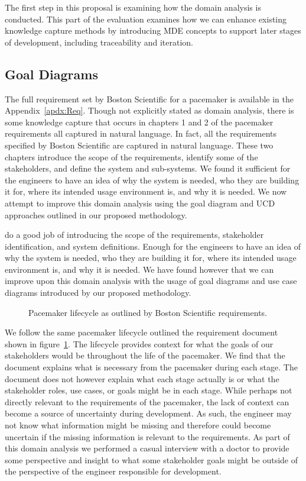The first step in this proposal is examining how the domain analysis is conducted. This part of the evaluation examines how we can enhance existing knowledge capture methods by introducing \ac{MDE} concepts to support later stages of development, including traceability and iteration.

\subsection{Goal Diagrams}

The full requirement set by Boston Scientific for a pacemaker is available in the Appendix~\ref{apdx:Req}. Though not explicitly stated as domain analysis, there is some knowledge capture that occurs in chapters 1 and 2 of the pacemaker requirements all captured in natural language. In fact, all the requirements specified by Boston Scientific are captured in natural language. These two chapters introduce the scope of the requirements, identify some of the stakeholders, and define the system and sub-systems. We found it sufficient for the engineers to have an idea of why the system is needed, who they are building it for, where its intended usage environment is, and why it is needed. We now attempt to improve this domain analysis using the goal diagram and  \ac{UCD} approaches outlined in our proposed methodology.



do a good job of introducing the scope of the requirements, stakeholder identification, and system definitions. Enough for the engineers to have an idea of why the system is needed, who they are building it for, where its intended usage environment is, and why it is needed. We have found however that we can improve upon this domain analysis with the usage of goal diagrams and use case diagrams introduced by our proposed methodology.

\begin{figure}
	\centering
	
	\caption{Pacemaker lifecycle as outlined by Boston Scientific requirements.}
	\label{fig:Pacemaker_lifecycle}
\end{figure}

We follow the same pacemaker lifecycle outlined the requirement document shown in figure~\ref{fig:Pacemaker_lifecycle}. The lifecycle provides context for what the goals of our stakeholders would be throughout the life of the pacemaker. We find that the document explains what is necessary from the pacemaker during each stage. The document does not however explain what each stage actually is or what the stakeholder roles, use cases, or goals might be in each stage. While perhaps not directly relevant to the requirements of the pacemaker, the lack of context can become a source of uncertainty during development. As such, the engineer may not know what information might be missing and therefore could become uncertain if the missing information is relevant to the requirements. As part of this domain analysis we performed a casual interview with a doctor to provide some perspective and insight to what some stakeholder goals might be outside of the perspective of the engineer responsible for development.


